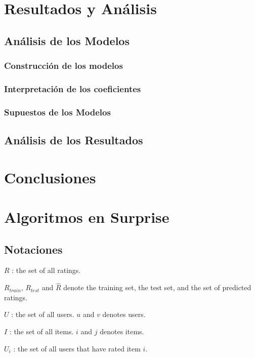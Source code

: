 \documentclass{article}
\begin{document}
\section{Resultados y Análisis}
\subsection{Análisis de los Modelos}
\subsubsection{Construcción de los modelos}
\subsubsection{Interpretación de los coeficientes}
\subsubsection{Supuestos de los Modelos}
\subsection{Análisis de los Resultados}

\section{Conclusiones}

\newpage
\printbibliography

\newpage
\appendix
\section{Algoritmos en Surprise}
\label{appendix:a}

\subsection{Notaciones}

$R$ : the set of all ratings.

$R_{train}$, $R_{test}$ and $\hat{R}$ denote the training set, the test set, and the set of predicted ratings.

$U$ : the set of all users. $u$ and $v$ denotes users.

$I$ : the set of all items. $i$ and $j$ denotes items.

$U_i$ : the set of all users that have rated item $i$.
\end{document}
